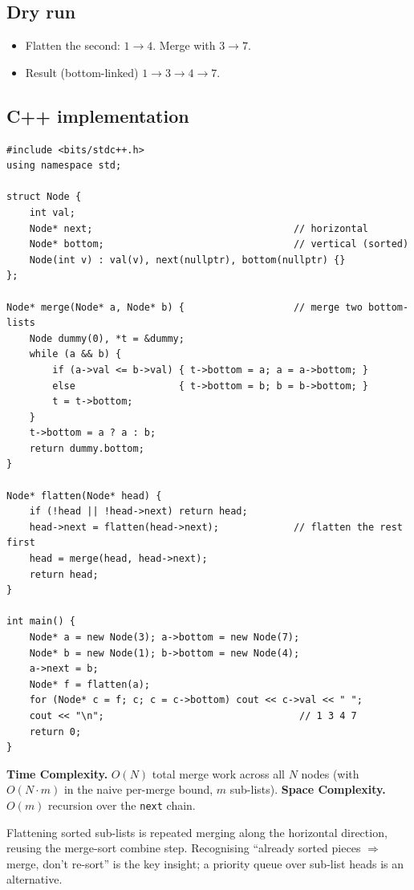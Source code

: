 \subsection*{Dry run}


\begin{itemize}
  \item Flatten the second: $1\to4$. Merge with $3\to7$.
  \item Result (bottom-linked) $1\to3\to4\to7$.
\end{itemize}

\subsection*{C++ implementation}

\begin{lstlisting}
#include <bits/stdc++.h>
using namespace std;

struct Node {
    int val;
    Node* next;                                   // horizontal
    Node* bottom;                                 // vertical (sorted)
    Node(int v) : val(v), next(nullptr), bottom(nullptr) {}
};

Node* merge(Node* a, Node* b) {                   // merge two bottom-lists
    Node dummy(0), *t = &dummy;
    while (a && b) {
        if (a->val <= b->val) { t->bottom = a; a = a->bottom; }
        else                  { t->bottom = b; b = b->bottom; }
        t = t->bottom;
    }
    t->bottom = a ? a : b;
    return dummy.bottom;
}

Node* flatten(Node* head) {
    if (!head || !head->next) return head;
    head->next = flatten(head->next);             // flatten the rest first
    head = merge(head, head->next);
    return head;
}

int main() {
    Node* a = new Node(3); a->bottom = new Node(7);
    Node* b = new Node(1); b->bottom = new Node(4);
    a->next = b;
    Node* f = flatten(a);
    for (Node* c = f; c; c = c->bottom) cout << c->val << " ";
    cout << "\n";                                  // 1 3 4 7
    return 0;
}
\end{lstlisting}

\begin{complexitybox}
\textbf{Time Complexity.} $O(N)$ total merge work across all
$N$ nodes (with $O(N\cdot m)$ in the naive per-merge bound, $m$ sub-lists).
\textbf{Space Complexity.} $O(m)$ recursion over the \texttt{next} chain.
\end{complexitybox}

\begin{takeawaybox}
Flattening sorted sub-lists is repeated merging along the horizontal
direction, reusing the merge-sort combine step. Recognising ``already
sorted pieces $\Rightarrow$ merge, don't re-sort'' is the key insight; a
priority queue over sub-list heads is an alternative.
\end{takeawaybox}
